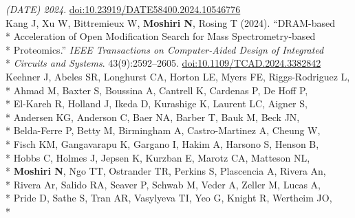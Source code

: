 \documentclass[margin,line]{res}
\begin{document}
\begin{resume}
\hspace*{8mm} \textit{(DATE) 2024}. \href{https://doi.org/10.23919/DATE58400.2024.10546776}{doi:10.23919/DATE58400.2024.10546776}\\
\hspace*{4mm} Kang J, Xu W, Bittremieux W, \textbf{Moshiri N}, Rosing T (2024). ``DRAM-based\\*
\hspace*{9mm} Acceleration of Open Modification Search for Mass Spectrometry-based\\*
\hspace*{9mm} Proteomics.'' \textit{IEEE Transactions on Computer-Aided Design of Integrated}\\*\vspace{2mm}
\hspace*{8mm} \textit{Circuits and Systems}. 43(9):2592--2605. \href{https://doi.org/10.1109/TCAD.2024.3382842}{doi:10.1109/TCAD.2024.3382842}\\
\hspace*{4mm} Keehner J, Abeles SR, Longhurst CA, Horton LE, Myers FE, Riggs-Rodriguez L,\\*
\hspace*{9mm} Ahmad M, Baxter S, Boussina A, Cantrell K, Cardenas P, De Hoff P,\\*
\hspace*{9mm} El-Kareh R, Holland J, Ikeda D, Kurashige K, Laurent LC, Aigner S,\\*
\hspace*{9mm} Andersen KG, Anderson C, Baer NA, Barber T, Bauk M, Beck JN,\\*
\hspace*{9mm} Belda-Ferre P, Betty M, Birmingham A, Castro-Martinez A, Cheung W,\\*
\hspace*{9mm} Fisch KM, Gangavarapu K, Gargano I, Hakim A, Harsono S, Henson B,\\*
\hspace*{9mm} Hobbs C, Holmes J, Jepsen K, Kurzban E, Marotz CA, Matteson NL,\\*
\hspace*{9mm} \textbf{Moshiri N}, Ngo TT, Ostrander TR, Perkins S, Plascencia A, Rivera An,\\*
\hspace*{9mm} Rivera Ar, Salido RA, Seaver P, Schwab M, Veder A, Zeller M, Lucas A,\\*
\hspace*{9mm} Pride D, Sathe S, Tran AR, Vasylyeva TI, Yeo G, Knight R, Wertheim JO,\\*

\end{resume}
\end{document}
